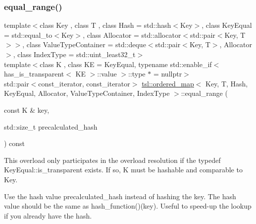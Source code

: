 \subsubsection{\texorpdfstring{equal\_range()}{equal\_range()}\hspace{0.1cm}{\footnotesize\ttfamily [6/6]}}
{\footnotesize\ttfamily template$<$class Key , class T , class Hash  = std\+::hash$<$\+Key$>$, class Key\+Equal  = std\+::equal\+\_\+to$<$\+Key$>$, class Allocator  = std\+::allocator$<$std\+::pair$<$\+Key, T$>$$>$, class Value\+Type\+Container  = std\+::deque$<$std\+::pair$<$\+Key, T$>$, Allocator$>$, class Index\+Type  = std\+::uint\+\_\+least32\+\_\+t$>$ \\
template$<$class K , class KE  = Key\+Equal, typename std\+::enable\+\_\+if$<$ has\+\_\+is\+\_\+transparent$<$ K\+E $>$\+::value $>$\+::type $\ast$  = nullptr$>$ \\
std\+::pair$<$const\+\_\+iterator, const\+\_\+iterator$>$ \mbox{\hyperlink{classtsl_1_1ordered__map}{tsl\+::ordered\+\_\+map}}$<$ Key, T, Hash, Key\+Equal, Allocator, Value\+Type\+Container, Index\+Type $>$\+::equal\+\_\+range (\begin{DoxyParamCaption}\item[{const K \&}]{key,  }\item[{std\+::size\+\_\+t}]{precalculated\+\_\+hash }\end{DoxyParamCaption}) const\hspace{0.3cm}{\ttfamily [inline]}}





This overload only participates in the overload resolution if the typedef Key\+Equal\+::is\+\_\+transparent exists. If so, K must be hashable and comparable to Key.

Use the hash value \textquotesingle{}precalculated\+\_\+hash\textquotesingle{} instead of hashing the key. The hash value should be the same as hash\+\_\+function()(key). Useful to speed-\/up the lookup if you already have the hash. \mbox{\label{classtsl_1_1ordered__map_aaf51b608561995a094a8b6ae4c5e5086}} 
